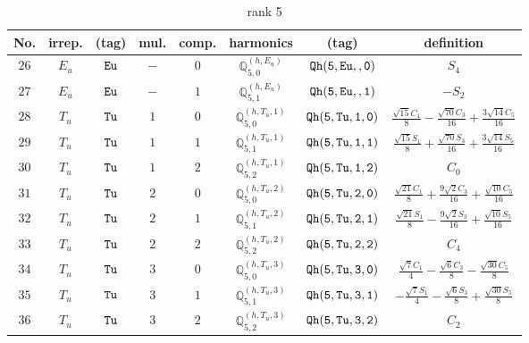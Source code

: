 \documentclass[fleqn,8pt]{jsarticle}
\begin{document}
\begin{table}[ht!]
\begin{center}
\caption{rank 5}
\renewcommand{\arraystretch}{1.3}
\begin{tabular}{cccccccc} \hline \hline
No. & irrep. & (tag) & mul. & comp. & harmonics & (tag) & definition \\ \hline
$ 26 $ & $ E_{u} $ & $ {\tt Eu} $ & $ - $ & $ 0 $ & $ \mathbb{Q}_{5,0}^{(h,E_{u})} $ & $ {\tt Qh(5,Eu,,0)} $ & $ S_{4} $ \\
$ 27 $ & $ E_{u} $ & $ {\tt Eu} $ & $ - $ & $ 1 $ & $ \mathbb{Q}_{5,1}^{(h,E_{u})} $ & $ {\tt Qh(5,Eu,,1)} $ & $ - S_{2} $ \\
$ 28 $ & $ T_{u} $ & $ {\tt Tu} $ & $ 1 $ & $ 0 $ & $ \mathbb{Q}_{5,0}^{(h,T_{u},1)} $ & $ {\tt Qh(5,Tu,1,0)} $ & $ \frac{\sqrt{15} C_{1}}{8} - \frac{\sqrt{70} C_{3}}{16} + \frac{3 \sqrt{14} C_{5}}{16} $ \\
$ 29 $ & $ T_{u} $ & $ {\tt Tu} $ & $ 1 $ & $ 1 $ & $ \mathbb{Q}_{5,1}^{(h,T_{u},1)} $ & $ {\tt Qh(5,Tu,1,1)} $ & $ \frac{\sqrt{15} S_{1}}{8} + \frac{\sqrt{70} S_{3}}{16} + \frac{3 \sqrt{14} S_{5}}{16} $ \\
$ 30 $ & $ T_{u} $ & $ {\tt Tu} $ & $ 1 $ & $ 2 $ & $ \mathbb{Q}_{5,2}^{(h,T_{u},1)} $ & $ {\tt Qh(5,Tu,1,2)} $ & $ C_{0} $ \\
$ 31 $ & $ T_{u} $ & $ {\tt Tu} $ & $ 2 $ & $ 0 $ & $ \mathbb{Q}_{5,0}^{(h,T_{u},2)} $ & $ {\tt Qh(5,Tu,2,0)} $ & $ \frac{\sqrt{21} C_{1}}{8} + \frac{9 \sqrt{2} C_{3}}{16} + \frac{\sqrt{10} C_{5}}{16} $ \\
$ 32 $ & $ T_{u} $ & $ {\tt Tu} $ & $ 2 $ & $ 1 $ & $ \mathbb{Q}_{5,1}^{(h,T_{u},2)} $ & $ {\tt Qh(5,Tu,2,1)} $ & $ \frac{\sqrt{21} S_{1}}{8} - \frac{9 \sqrt{2} S_{3}}{16} + \frac{\sqrt{10} S_{5}}{16} $ \\
$ 33 $ & $ T_{u} $ & $ {\tt Tu} $ & $ 2 $ & $ 2 $ & $ \mathbb{Q}_{5,2}^{(h,T_{u},2)} $ & $ {\tt Qh(5,Tu,2,2)} $ & $ C_{4} $ \\
$ 34 $ & $ T_{u} $ & $ {\tt Tu} $ & $ 3 $ & $ 0 $ & $ \mathbb{Q}_{5,0}^{(h,T_{u},3)} $ & $ {\tt Qh(5,Tu,3,0)} $ & $ \frac{\sqrt{7} C_{1}}{4} - \frac{\sqrt{6} C_{3}}{8} - \frac{\sqrt{30} C_{5}}{8} $ \\
$ 35 $ & $ T_{u} $ & $ {\tt Tu} $ & $ 3 $ & $ 1 $ & $ \mathbb{Q}_{5,1}^{(h,T_{u},3)} $ & $ {\tt Qh(5,Tu,3,1)} $ & $ - \frac{\sqrt{7} S_{1}}{4} - \frac{\sqrt{6} S_{3}}{8} + \frac{\sqrt{30} S_{5}}{8} $ \\
$ 36 $ & $ T_{u} $ & $ {\tt Tu} $ & $ 3 $ & $ 2 $ & $ \mathbb{Q}_{5,2}^{(h,T_{u},3)} $ & $ {\tt Qh(5,Tu,3,2)} $ & $ C_{2} $ \\
 \hline \hline
\end{tabular}
\end{center}
\end{table}
\end{document}
